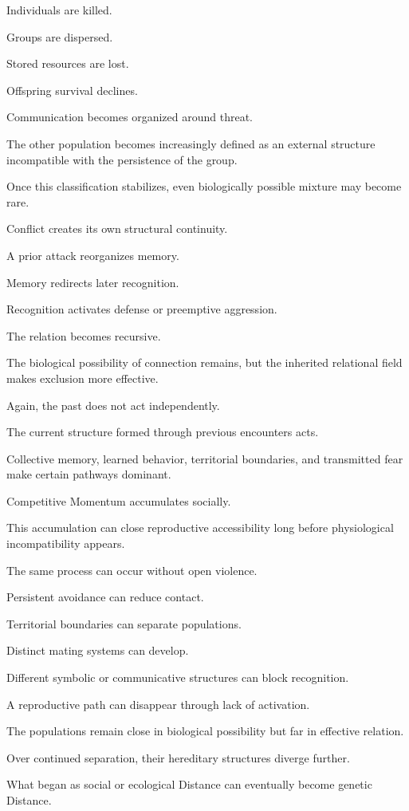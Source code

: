 Individuals are killed.

Groups are dispersed.

Stored resources are lost.

Offspring survival declines.

Communication becomes organized around threat.

The other population becomes increasingly defined as an external structure incompatible with the persistence of the group.

Once this classification stabilizes, even biologically possible mixture may become rare.

Conflict creates its own structural continuity.

A prior attack reorganizes memory.

Memory redirects later recognition.

Recognition activates defense or preemptive aggression.

The relation becomes recursive.

The biological possibility of connection remains, but the inherited relational field makes exclusion more effective.

Again, the past does not act independently.

The current structure formed through previous encounters acts.

Collective memory, learned behavior, territorial boundaries, and transmitted fear make certain pathways dominant.

Competitive Momentum accumulates socially.

This accumulation can close reproductive accessibility long before physiological incompatibility appears.

The same process can occur without open violence.

Persistent avoidance can reduce contact.

Territorial boundaries can separate populations.

Distinct mating systems can develop.

Different symbolic or communicative structures can block recognition.

A reproductive path can disappear through lack of activation.

The populations remain close in biological possibility but far in effective relation.

Over continued separation, their hereditary structures diverge further.

What began as social or ecological Distance can eventually become genetic Distance.

